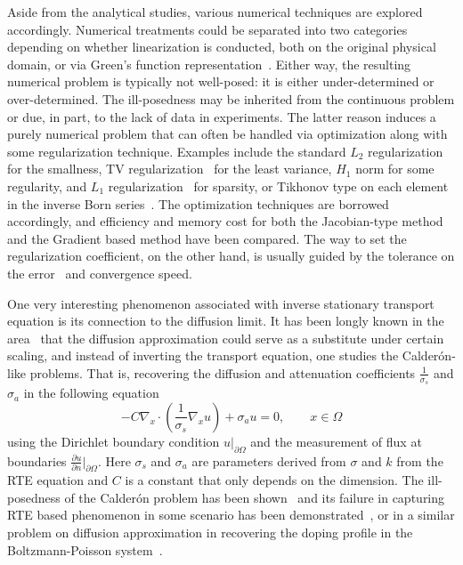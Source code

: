 \documentclass[english,reqno]{amsart}
\theoremstyle{plain}
\theoremstyle{definition} %
\begin{document}
Aside from the analytical studies, various numerical techniques are explored accordingly. Numerical treatments could be separated into two categories depending on whether linearization is conducted, both on the original physical domain, or via Green's function representation~\cite{Machida:16,Machida_Schotland_inverse}. Either way, the resulting numerical problem is typically not well-posed: it is either under-determined or over-determined. The ill-posedness may be inherited from the continuous problem or due, in part, to the lack of data in experiments. The latter reason induces a purely numerical problem that can often be handled via optimization along with some regularization technique. Examples include the standard $L_2$ regularization~\cite{SRH05} for the smallness, TV regularization~\cite{Tang} for the least variance, $H_1$ norm for some regularity, and $L_1$ regularization~\cite{Ren_review} for sparsity, or Tikhonov type on each element in the inverse Born series~\cite{Machida_Schotland_inverse}. The optimization techniques are borrowed accordingly, and efficiency and memory cost for both the Jacobian-type method and the Gradient based method have been compared. The way to set the regularization coefficient, on the other hand, is usually guided by the tolerance on the error~\cite{EHN96, Egger2015} and convergence speed.

One very interesting phenomenon associated with inverse stationary transport equation is its connection to the diffusion limit. It has been longly known in the area~\cite{RenBalHielscher_trans_diff, Arridge99, Arridge98} that the diffusion approximation could serve as a substitute under certain scaling, and instead of inverting the transport equation, one studies the Calder\'on-like problems. That is, recovering the diffusion and attenuation coefficients $\frac{1}{\sigma_s}$ and $\sigma_a$ in the following equation
\begin{equation}
-C\nabla_x\cdot \left(\frac{1}{\sigma_s}\nabla_xu \right) + \sigma_a u = 0, \qquad x \in \Omega
\end{equation}
using the Dirichlet boundary condition $u|_{\partial\Omega}$ and the measurement of flux at boundaries $\frac{\partial u}{\partial n}|_{\partial \Omega}$. Here $\sigma_s$ and $\sigma_a$ are parameters derived from $\sigma$ and $k$ from the RTE equation and $C$ is a constant that only depends on the dimension. The ill-posedness of the Calder\'on problem has been shown~\cite{Uhlmann03,Uhlmann09} and its failure in capturing RTE based phenomenon in some scenario has been demonstrated~\cite{Arridge98}, or in a similar problem on diffusion approximation in recovering the doping profile in the Boltzmann-Poisson system~\cite{Gamba}.
\end{document}
